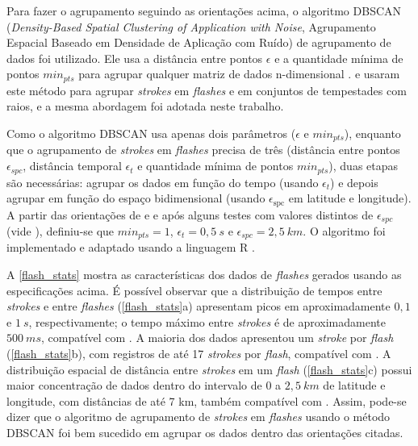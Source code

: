 Para fazer o agrupamento seguindo as orientações acima, o algoritmo DBSCAN (\textit{Density-Based Spatial Clustering of Application with Noise}, Agrupamento Espacial Baseado em Densidade de Aplicação com Ruído) de agrupamento de dados foi utilizado. Ele usa a distância entre pontos $\epsilon$ e a quantidade mínima de pontos $min_{pts}$ para agrupar qualquer matriz de dados n-dimensional \cite{Ester1996, Kriegel2011}.  e  usaram este método para agrupar \textit{strokes} em \textit{flashes} e em conjuntos de tempestades com raios, e a mesma abordagem foi adotada neste trabalho.

Como o algoritmo DBSCAN usa apenas dois parâmetros ($\epsilon$ e $min_{pts}$), enquanto que o agrupamento de \textit{strokes} em \textit{flashes} precisa de três (distância entre pontos $\epsilon_{spc}$, distância temporal $\epsilon_{t}$ e quantidade mínima de pontos $min_{pts}$), duas etapas são necessárias: agrupar os dados em função do tempo (usando $\epsilon_{t}$) e depois agrupar em função do espaço bidimensional (usando $\epsilon_{\text{spc}}$ em latitude e longitude). A partir das orientações de  e  e após alguns testes com valores distintos de $\epsilon_{spc}$ (vide ), definiu-se que $min_{pts}=1$, $\epsilon_{t}=0,5\:s$ e $\epsilon_{spc}=2,5\:km$. O algoritmo foi implementado e adaptado usando a linguagem R \cite{RCoreTeam2018a}.

A \autoref{flash_stats} mostra as características dos dados de \textit{flashes} gerados usando as especificações acima. É possível observar que a distribuição de tempos entre \textit{strokes} e entre \textit{flashes} (\autoref{flash_stats}a) apresentam picos em aproximadamente $0,1$ e $1\:s$, respectivamente; o tempo máximo entre \textit{strokes} é de aproximadamente $500\:ms$, compatível com . A maioria dos dados apresentou um \textit{stroke} por \textit{flash} (\autoref{flash_stats}b), com registros de até 17 \textit{strokes} por \textit{flash}, compatível com . A distribuição espacial de distância entre \textit{strokes} em um \textit{flash} (\autoref{flash_stats}c) possui maior concentração de dados dentro do intervalo de 0 a $2,5\:km$ de latitude e longitude, com distâncias de até 7 km, também compatível com . Assim, pode-se dizer que o algoritmo de agrupamento de \textit{strokes} em \textit{flashes} usando o método DBSCAN foi bem sucedido em agrupar os dados dentro das orientações citadas.

